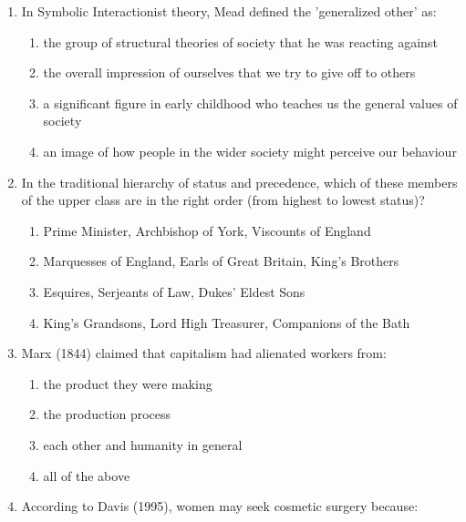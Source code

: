 \documentclass[12pt]{article}
\begin{document}
\begin{enumerate}[label=\arabic*.]
\begin{enumerate}[label=(\alph*)]
    \item an empire with a bureaucratic administration but no political centre
    \item an awareness of risks and dangers that affect the environment as a whole
    \item a unit with a division of labour that extends across ethnic and cultural groups
\end{enumerate}
\item In Symbolic Interactionist theory, Mead defined the 'generalized other' as:
\begin{enumerate}[label=(\alph*)]
    \item the group of structural theories of society that he was reacting against
    \item the overall impression of ourselves that we try to give off to others
    \item a significant figure in early childhood who teaches us the general values of society
    \item an image of how people in the wider society might perceive our behaviour
\end{enumerate}
\item In the traditional hierarchy of status and precedence, which of these members of the upper class are in the right order (from highest to lowest status)?
\begin{enumerate}[label=(\alph*)]
    \item Prime Minister, Archbishop of York, Viscounts of England
    \item Marquesses of England, Earls of Great Britain, King's Brothers
    \item Esquires, Serjeants of Law, Dukes' Eldest Sons
    \item King's Grandsons, Lord High Treasurer, Companions of the Bath
\end{enumerate}
\item Marx (1844) claimed that capitalism had alienated workers from:
\begin{enumerate}[label=(\alph*)]
    \item the product they were making
    \item the production process
    \item each other and humanity in general
    \item all of the above
\end{enumerate}
\item According to Davis (1995), women may seek cosmetic surgery because:
\begin{enumerate}[label=(\alph*)]

\end{enumerate}
\end{enumerate}
\end{document}
